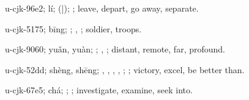\begin{multicols}{2}
{\cjkgGlue{}u-cjk-96e2; lí; \cjkgGlue{}\cjkgGlue{}(\cjkgGlue{}|\cjkgGlue{}); \cjkgGlue{}; leave, depart, go away, separate.

\cjkgGlue{}u-cjk-5175; bīng; \cjkgGlue{}; \cjkgGlue{}, \cjkgGlue{}; soldier, troops.

\cjkgGlue{}u-cjk-9060; yuǎn, yuàn; \cjkgGlue{}\cjkgGlue{}\cjkgGlue{}; \cjkgGlue{}, \cjkgGlue{}; distant, remote, far, profound.

\cjkgGlue{}u-cjk-52dd; shèng, shēng; \cjkgGlue{}\cjkgGlue{}\cjkgGlue{}, \cjkgGlue{}\cjkgGlue{}\cjkgGlue{}, \cjkgGlue{}\cjkgGlue{}\cjkgGlue{}, \cjkgGlue{}\cjkgGlue{}\cjkgGlue{}, \cjkgGlue{}; \cjkgGlue{}; victory, excel, be better than.

\cjkgGlue{}u-cjk-67e5; chá; \cjkgGlue{}; \cjkgGlue{}; investigate, examine, seek into.

}
\end{multicols}
